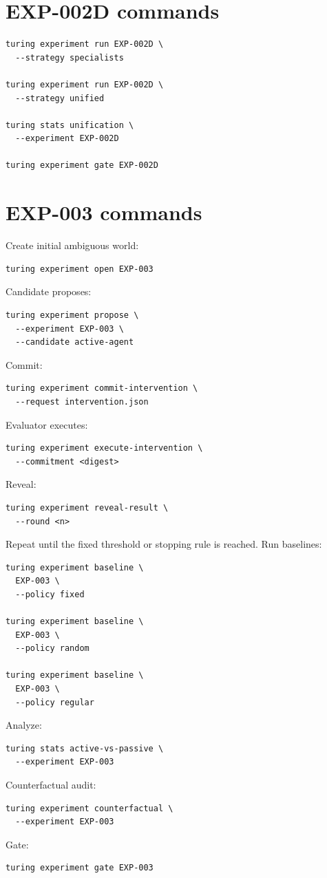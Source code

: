 \documentclass[11pt]{article}
\begin{document}
\section{EXP-002D commands}

\begin{verbatim}
turing experiment run EXP-002D \
  --strategy specialists

turing experiment run EXP-002D \
  --strategy unified

turing stats unification \
  --experiment EXP-002D

turing experiment gate EXP-002D
\end{verbatim}

\section{EXP-003 commands}

Create initial ambiguous world:
\begin{verbatim}
turing experiment open EXP-003
\end{verbatim}
Candidate proposes:
\begin{verbatim}
turing experiment propose \
  --experiment EXP-003 \
  --candidate active-agent
\end{verbatim}
Commit:
\begin{verbatim}
turing experiment commit-intervention \
  --request intervention.json
\end{verbatim}
Evaluator executes:
\begin{verbatim}
turing experiment execute-intervention \
  --commitment <digest>
\end{verbatim}
Reveal:
\begin{verbatim}
turing experiment reveal-result \
  --round <n>
\end{verbatim}
Repeat until the fixed threshold or stopping rule is reached. Run baselines:
\begin{verbatim}
turing experiment baseline \
  EXP-003 \
  --policy fixed

turing experiment baseline \
  EXP-003 \
  --policy random

turing experiment baseline \
  EXP-003 \
  --policy regular
\end{verbatim}
Analyze:
\begin{verbatim}
turing stats active-vs-passive \
  --experiment EXP-003
\end{verbatim}
Counterfactual audit:
\begin{verbatim}
turing experiment counterfactual \
  --experiment EXP-003
\end{verbatim}
Gate:
\begin{verbatim}
turing experiment gate EXP-003
\end{verbatim}
\end{document}
